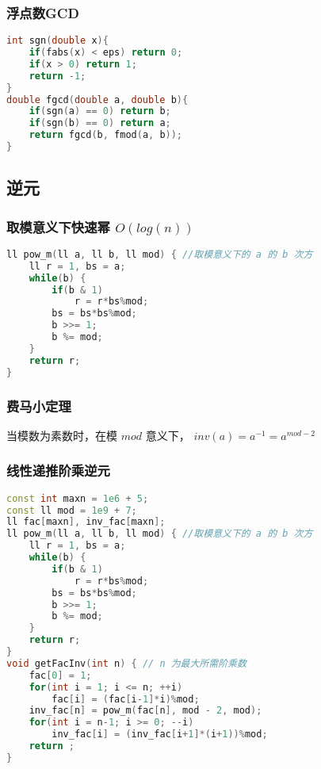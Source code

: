 \subsubsection{浮点数GCD}

\begin{lstlisting}[language=C++]
int sgn(double x){
    if(fabs(x) < eps) return 0;
    if(x > 0) return 1;
    return -1;
}
double fgcd(double a, double b){
    if(sgn(a) == 0) return b;
    if(sgn(b) == 0) return a;
    return fgcd(b, fmod(a, b));
}
\end{lstlisting}

\subsection{逆元}

\subsubsection{取模意义下快速幂 $O(log(n))$}

\begin{lstlisting}[language=C++]
ll pow_m(ll a, ll b, ll mod) { //取模意义下的 a 的 b 次方
    ll r = 1, bs = a;
    while(b) {
        if(b & 1)
            r = r*bs%mod;
        bs = bs*bs%mod;
        b >>= 1;
        b %= mod;
    }
    return r;
}
\end{lstlisting}

\subsubsection{费马小定理}

当模数为素数时，在模 $mod$ 意义下， $inv(a) = a^{-1} = a^{mod - 2}$

\subsubsection{线性递推阶乘逆元}

\begin{lstlisting}[language=C++]
const int maxn = 1e6 + 5;
const ll mod = 1e9 + 7;
ll fac[maxn], inv_fac[maxn];
ll pow_m(ll a, ll b, ll mod) { //取模意义下的 a 的 b 次方
    ll r = 1, bs = a;
    while(b) {
        if(b & 1)
            r = r*bs%mod;
        bs = bs*bs%mod;
        b >>= 1;
        b %= mod;
    }
    return r;
}
void getFacInv(int n) { // n 为最大所需阶乘数
    fac[0] = 1;
    for(int i = 1; i <= n; ++i)
        fac[i] = (fac[i-1]*i)%mod;
    inv_fac[n] = pow_m(fac[n], mod - 2, mod);
    for(int i = n-1; i >= 0; --i)
        inv_fac[i] = (inv_fac[i+1]*(i+1))%mod;
    return ;
}
\end{lstlisting}

